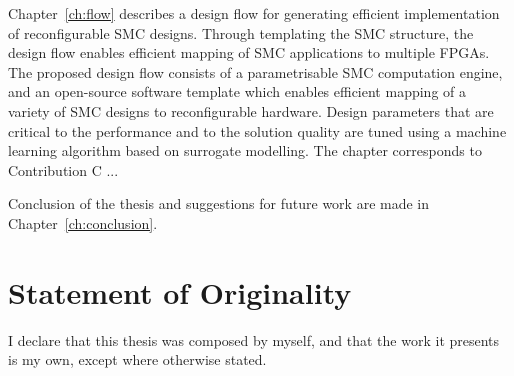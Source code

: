 Chapter~\ref{ch:flow} describes a design flow for generating efficient implementation of reconfigurable SMC designs. 
Through templating the SMC structure, the design flow enables efficient mapping of SMC applications to multiple FPGAs.
The proposed design flow consists of a parametrisable SMC computation engine, and an open-source software template which enables efficient mapping of a variety of SMC designs to reconfigurable hardware.
Design parameters that are critical to the performance and to the solution quality are tuned using a machine learning algorithm based on surrogate modelling.
The chapter corresponds to Contribution C ...

Conclusion of the thesis and suggestions for future work are made in Chapter~\ref{ch:conclusion}.

\section{Statement of Originality}

I declare that this thesis was composed by myself, and that the work it presents is my own, except where otherwise stated.

